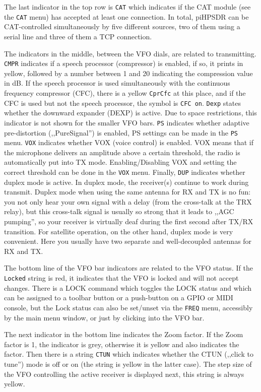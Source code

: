 \documentclass[12pt]{book}
\def\rett#1{\texttt{\color{red}#1}}
\def\bltt#1{\texttt{\color{blue}#1}}
\def\pH{pi\-HPSDR\xspace}
\begin{document}
The last indicator in the top row  is \rett{CAT} which indicates
if the CAT module  (see the \bltt{CAT}  menu) has accepted at least
one connection. In total, \pH can be CAT-controlled simultaneously
by five different sources, two of them using a serial line and
three of them a TCP connection.

The indicators in the middle, between the VFO dials, are related to
transmitting. \rett{CMPR} indicates if a speech processor
(compressor) is enabled, if so, it prints in yellow, followed
by a number between 1 and 20 indicating the compression value in dB.
If the speech processor is used simultaneously with the continuous frequency
compressor (CFC), there is a yellow \rett{CprCfc} at this place, and if
the CFC is used but not the speech processor, the symbol is \rett{CFC on}.
\rett{Dexp} states whether the downward expander (DEXP) is active. Due to space
restrictions, this indicator is not shown for the smaller VFO bars.
\rett{PS} indicates whether adaptive pre-distortion (,,PureSignal'')
is enabled, PS settings can be made in the \bltt{PS} menu.
\rett{VOX} indicates whether VOX (voice control) is enabled. VOX means
that if  the microphone delivers an amplitude above a certain threshold,
the radio is automatically put into TX mode. Enabling/Disabling VOX
and setting the correct threshold can be done in the \bltt{VOX} menu.
Finally, \rett{DUP} indicates whether duplex mode is active.
In duplex mode, the receiver(s) continue to work during transmit. Duplex
mode when using the same antenna for RX and TX is  no fun: you not only hear
your own signal with a delay (from the cross-talk at the TRX relay), but
this cross-talk signal is  usually so strong that it leads to ,,AGC pumping'', so
your receiver is virtually deaf during the first second after TX/RX
transition. For satellite operation, on the other hand, duplex  mode
is very convenient. Here you usually have two separate and well-decoupled
antennas for RX and TX.

The bottom line of the VFO bar  indicators are related to the VFO status.
If the \rett{Locked} string is red, it indicates that the VFO is locked
and will not accept changes. There is a LOCK command which toggles the
LOCK status and which can be assigned to a toolbar button or a push-button
on a GPIO or MIDI console, but the Lock status can also be set/unset
via the \bltt{FREQ} menu, accessibly by the main menu window, or just by
clicking into the VFO bar.

The next indicator in the bottom  line indicates the Zoom factor. If the
Zoom factor is 1, the indicator is grey, otherwise it is yellow and
also indicates the factor. Then there is a string \rett{CTUN} which
indicates whether the CTUN (,,click to tune'') mode is off or on (the string
is yellow in the latter case). The step size of the VFO controlling the
active receiver is displayed next, this string is always yellow.
\end{document}
